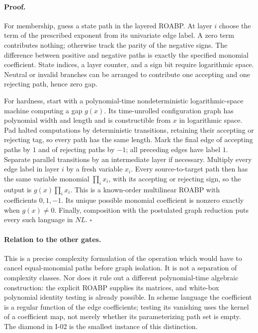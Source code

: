 \documentclass[11pt,a4paper]{article}
\theoremstyle{definition}\newtheorem{definition}{Definition}
\begin{document}
\paragraph{Proof.}
For membership, guess a state path in the layered ROABP.  At layer
$i$ choose the term of the prescribed exponent from its univariate
edge label.  A zero term contributes nothing; otherwise track the
parity of the negative signs.  The difference between positive and
negative paths is exactly the specified monomial coefficient.
State indices, a layer counter, and a sign bit require logarithmic
space.  Neutral or invalid branches can be arranged to contribute
one accepting and one rejecting path, hence zero gap.

For hardness, start with a polynomial-time nondeterministic
logarithmic-space machine computing a gap $g(x)$.  Its time-unrolled
configuration graph has polynomial width and length and is
constructible from $x$ in logarithmic space.  Pad halted computations
by deterministic transitions, retaining their accepting or rejecting
tag, so every path has the same length.  Mark the final edge
of accepting paths by $1$ and of rejecting paths by $-1$;
all preceding edges have label $1$.  Separate parallel transitions
by an intermediate layer if necessary.  Multiply every edge label
in layer $i$ by a fresh variable $x_i$.  Every source-to-target path
then has the same variable monomial $\prod_i x_i$, with its
accepting or rejecting sign, so the output is
$g(x)\prod_i x_i$.  This is a known-order multilinear ROABP with
coefficients $0,1,-1$.  Its unique possible monomial coefficient
is nonzero exactly when $g(x)\ne0$.  Finally, composition with the
postulated graph reduction puts every such language in $NL$.
\hfill$\square$

\paragraph{Relation to the other gates.}
This is a precise complexity formulation of the operation which
would have to cancel equal-monomial paths before graph isolation.
It is not a separation of complexity classes.  Nor does it rule
out a different polynomial-time algebraic construction: the
explicit ROABP supplies its matrices, and white-box polynomial
identity testing is already possible.  In scheme language the
coefficient is a regular function of the edge coefficients;
testing its vanishing uses the kernel of a coefficient map, not
merely whether its parameterizing path set is empty.  The diamond
in I-02 is the smallest instance of this distinction.
\end{document}
